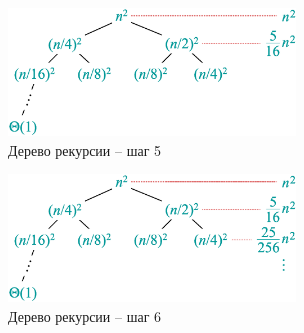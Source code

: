 \documentclass[11pt]{article}
\begin{document}
\begin{figure}[p]
  \centering
  \includegraphics[width=3in]{lecture2/tree5.eps}
  \caption{Дерево рекурсии -- шаг 5}
  \label{fig:rectree5}
\end{figure}

\begin{figure}[p]
  \centering
  \includegraphics[width=3in]{lecture2/tree6.eps}
  \caption{Дерево рекурсии -- шаг 6}
  \label{fig:rectree6}
\end{figure}
\end{document}
